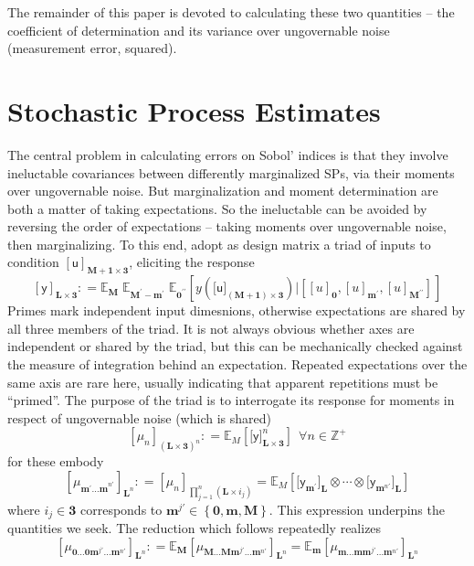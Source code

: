 \documentclass[preprint,12pt]{elsarticle}
\newcommand*{\M}[1]{\ensuremath{#1}\xspace}
\newcommand*{\x}{\times}
\newcommand*{\mi}[1]{\mathbf{#1}}
\newcommand*{\st}[1]{\mathbb{#1}}
\newcommand*{\rv}[1]{\mathsf{#1}}
\newcommand*{\te}[2][]{\left\lbrack{#2}\right\rbrack_{#1}}
\newcommand*{\tte}[2][]{\lbrack{#2}\rbrack_{#1}}
\newcommand*{\deq}{\M{\mathrel{\mathop:}=}}
\newcommand*{\ev}[3][]{\mathbb{E}_{#3}^{#1}\!\left\lbrack{#2}\right\rbrack}
\newcommand*{\evt}[3][]{\mathbb{E}_{#3}^{#1}\!#2}
\newcommand*{\set}[1]{\M{\left\lbrace{#1}\right\rbrace}}
\begin{document}
    The remainder of this paper is devoted to calculating these two quantities -- the coefficient of determination and its variance over ungovernable noise (measurement error, squared).


\section{Stochastic Process Estimates}\label{sec:SPEst}
    The central problem in calculating errors on Sobol' indices is that they involve ineluctable covariances between differently marginalized SPs, via their moments over ungovernable noise. But marginalization and moment determination are both a matter of taking expectations. So the ineluctable can be avoided by reversing the order of expectations -- taking moments over ungovernable noise, then marginalizing.
    To this end, adopt as design matrix a triad of inputs to condition $\te[\mi{M+1\x 3}]{\rv{u}}$, eliciting the response
    \begin{equation}\label{def:SPEst:y}
        \te[\mi{L\x 3}]{\rv{y}} \deq 
        \evt{\;\evt{\;\ev{y(\tte[\mi{(M+1)\x 3}]{\rv{u}}) 
            \big\vert \te[]{\te[\mi{0}]{u}, \te[\mi{m^{\prime}}]{u}, \te[\mi{M^{\prime\prime}}]{u}}}{\mi{0^{\prime\prime}}}}
        {\mi{M^{\prime}-m^{\prime}}}}{\mi{M}}
    \end{equation}
    Primes mark independent input dimesnions, otherwise expectations are shared by all three members of the triad. It is not always obvious whether axes are independent or shared by the triad, but this can be mechanically checked against the measure of integration behind an expectation. Repeated expectations over the same axis are rare here, usually indicating that apparent repetitions must be ``primed''. The purpose of the triad is to interrogate its response for moments in respect of ungovernable noise (which is shared)
    \begin{equation}\label{def:SPEst:mu}
            \te[(\mi{L\x 3})^{n}]{\mu_{n}} \deq \ev{\tte[\mi{L\x 3}]{\rv{y}}^{n}}{M} \ \ \forall n \in \st{Z}^{+}
    \end{equation}
    for these embody
    \begin{equation*}
        \te[\mi{L}^{n}]{\mu_{\mi{m^{\prime}\ldots m}^{n\prime}}} \deq \te[\prod_{j=1}^{n}(\mi{L\x}i_{j})]{\mu_{n}} = \ev{\tte[\mi{L}]{\rv{y}_{\mi{m}^{\prime}}}\otimes\cdots\otimes\tte[\mi{L}]{\rv{y}_{\mi{m}^{n\prime}}}}{M}
    \end{equation*}
    where $i_{j}\in \mi{3}$ corresponds to $\mi{m}^{j\prime} \in \set{\mi{0},\mi{m},\mi{M}}$. This expression underpins the quantities we seek. The reduction which follows repeatedly realizes
    \begin{equation}\label{eq:SPEstimates:reduction}
        \te[\mi{L}^{n}]{\mu_{\mi{0\ldots 0}\mi{m}^{j\prime}\mi{\ldots m}^{n\prime}}} \deq 
        \evt{\te[\mi{L}^{n}]{\mu_{\mi{M\ldots M}\mi{m}^{j\prime}\mi{\ldots m}^{n\prime}}}}{\mi{M}} = 
        \evt{\te[\mi{L}^{n}]{\mu_{\mi{m\ldots m}\mi{m}^{j\prime}\mi{\ldots m}^{n\prime}}}}{\mi{m}}
    \end{equation}
\end{document}
